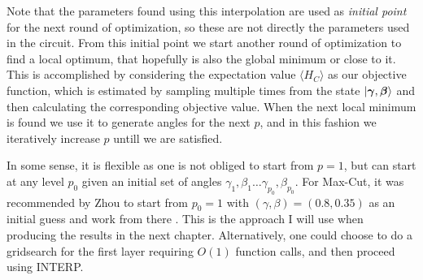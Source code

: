 Note that the parameters found using this interpolation are used as \emph{initial point} for the next round of optimization, so these are not directly the parameters used in the circuit. From this initial point we start another round of optimization to find a local optimum, that hopefully is also the global minimum or close to it. This is accomplished by considering the expectation value $\langle H_C \rangle$ as our objective function, which is estimated by sampling multiple times from the state $|\bm{\gamma},\bm{\beta}\rangle$ and then calculating the corresponding objective value. When the next local minimum is found we use it to generate angles for the next $p$, and in this fashion we iteratively increase $p$ untill we are satisfied.

In some sense, it is flexible as one is not obliged to start from $p=1$, but can start at any level $p_{0}$ given an initial set of angles $\gamma_1, \beta_1 \dots \gamma_{p_{0}}, \beta_{p_{0}}$. For Max-Cut, it was recommended by Zhou to start from $p_0=1$ with $(\gamma, \beta) = (0.8,0.35)$ as an initial guess and work from there \cite{Zhou-email, genQAOA}. This is the approach I will use when producing the results in the next chapter. Alternatively, one could choose to do a gridsearch for the first layer requiring $O(1)$ function calls, and then proceed using INTERP.



